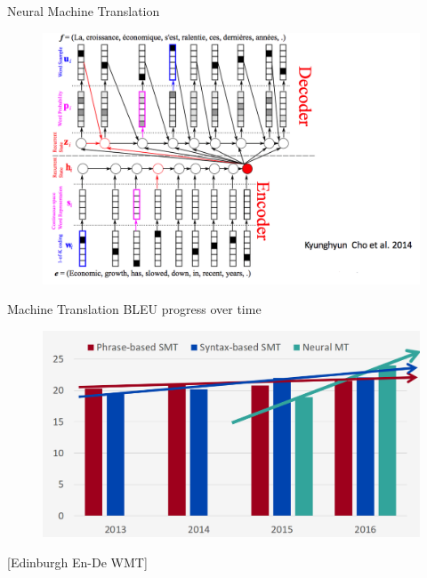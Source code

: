 \begin{frame}{Neural Machine Translation}
         \begin{figure}[h]
        	\includegraphics[scale = 0.25]{pics/mt.png}
        \end{figure}  
\end{frame}


\begin{frame}{Machine Translation BLEU progress over time}
         \begin{figure}[h]
        	\includegraphics[scale = 0.35]{pics/nmt_progress.png}
        \end{figure}  
[Edinburgh En-De WMT]        
\end{frame}


